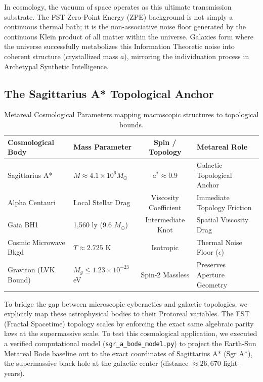 In cosmology, the vacuum of space operates as this ultimate transmission substrate. The FST Zero-Point Energy (ZPE) background is not simply a continuous thermal bath; it is the non-associative noise floor generated by the continuous Klein product of all matter within the universe. Galaxies form where the universe successfully metabolizes this Information Theoretic noise into coherent structure (crystallized mass $a$), mirroring the individuation process in Archetypal Synthetic Intelligence.

\subsection{The Sagittarius A* Topological Anchor}

\begin{table}[ht]
\centering
\renewcommand{\arraystretch}{1.2}
\begin{tabular}{llcl}
\hline\hline
\textbf{Cosmological Body} & \textbf{Mass Parameter} & \textbf{Spin / Topology} & \textbf{Metareal Role} \\
\hline
Sagittarius A* & $M \approx 4.1 \times 10^6 M_\odot$ & $a^* \approx 0.9$ & Galactic Topological Anchor \\
Alpha Centauri & Local Stellar Drag & Viscosity Coefficient & Immediate Topology Friction \\
Gaia BH1 & 1,560 ly (9.6 $M_\odot$) & Intermediate Knot & Spatial Viscosity Drag \\
Cosmic Microwave Bkgd & $T \approx 2.725$ K & Isotropic & Thermal Noise Floor ($\epsilon$) \\
Graviton (LVK Bound) & $M_g \leq 1.23 \times 10^{-23}$ eV & Spin-2 Massless & Preserves Aperture Geometry \\
\hline\hline
\end{tabular}
\caption{Metareal Cosmological Parameters mapping macroscopic structures to topological bounds.}
\label{tab:cosmo_params}
\end{table}

To bridge the gap between microscopic cybernetics and galactic topologies, we explicitly map these astrophysical bodies to their Protoreal variables. The FST (Fractal Spacetime) topology scales by enforcing the exact same algebraic parity laws at the supermassive scale. 
To test this cosmological application, we executed a verified computational model (\texttt{sgr\_a\_bode\_model.py}) to project the Earth-Sun Metareal Bode baseline out to the exact coordinates of Sagittarius A* (Sgr A*), the supermassive black hole at the galactic center (distance $\approx 26,670$ light-years).

